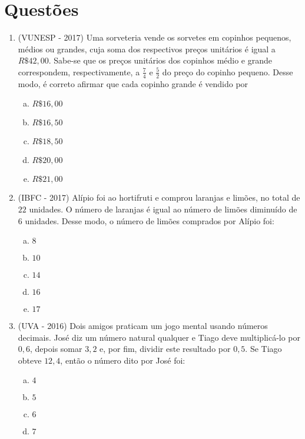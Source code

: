 \section{Questões}
 
\begin{enumerate}
 \item (VUNESP - 2017) Uma sorveteria vende os sorvetes em copinhos pequenos, médios ou grandes, cuja soma dos respectivos preços unitários é igual a $R\$ 42,00$. Sabe-se que os preços unitários dos copinhos médio e grande correspondem, respectivamente, a $\frac{7}{4}$ e $\frac{5}{2}$ do preço do copinho pequeno. Desse modo, é correto afirmar que cada copinho grande é vendido por
 \begin{multicols}{5}
 \begin{enumerate}[a)]
 \item $R\$ 16,00$
 \item $R\$ 16,50$
 \item $R\$ 18,50$
 \item $R\$ 20,00$
 \item $R\$ 21,00$
 \end{enumerate}
 \end{multicols}
 
 \item (IBFC - 2017) Alípio foi ao hortifruti e comprou laranjas e limões, no total de $22$ unidades. O número de laranjas é igual ao número de limões diminuído de $6$ unidades. Desse modo, o número de limões comprados por Alípio foi:
 \begin{multicols}{5}
 \begin{enumerate}[a)]
 \item $8$
 \item $10$
 \item $14$
 \item $16$
 \item $17$
 \end{enumerate}
 \end{multicols}
 
 \item (UVA - 2016) Dois amigos praticam um jogo mental usando números decimais. José diz um número natural qualquer e Tiago deve multiplicá-lo por $0,6$, depois somar $3,2$ e, por fim, dividir este resultado por $0,5$. Se Tiago obteve $12,4$, então o número dito por José foi:
 \begin{multicols}{5}
 \begin{enumerate}[a)]
 \item $4$
 \item $5$
 \item $6$
 \item $7$
 \end{enumerate}
 \end{multicols}
 

\end{enumerate}
